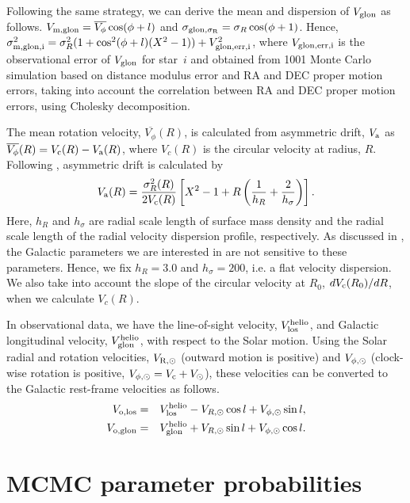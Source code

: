 \documentclass[11pt,a4paper]{article}
\begin{document}
Following the same strategy, we can derive the mean and dispersion of $V_{\rm glon}$ as follows. $V_{\rm m, glon}=\overline{V_{\phi}}\cos(\phi+l)$ and $\sigma_{\rm glon,\sigma_R}=\sigma_R \cos(\phi+1)$. Hence, $\sigma_{\rm m, glon,i}^2=\sigma_R^2(1+\cos^2(\phi+l) (X^2-1))+V_{\rm glon,err,i}^2$, where $V_{\rm glon,err,i}$ is the observational error of $V_{\rm glon}$ for star~$i$ and obtained from 1001 Monte Carlo simulation based on distance modulus error and RA and DEC proper motion errors, taking into account the correlation between RA and DEC proper motion errors, using Cholesky decomposition. 

The mean rotation velocity, $\overline{V_{\phi}} (R)$, is calculated from asymmetric drift, $V_{\rm a}$ as $\overline{V_{\phi}}(R)=V_{\rm c} (R)-V_{\rm a}(R)$, where $V_c(R)$ is the circular velocity at radius, $R$. Following \citet{baabbdc12}, asymmetric drift is calculated by 
\begin{equation}
V_{\rm a}(R)=\frac{\sigma_R^2(R)}{2 V_{\rm c}(R)} \left[X^2-1+R\left(\frac{1}{h_R}+\frac{2}{h_{\sigma}}\right)\right].
\end{equation}
Here, $h_R$ and $h_{\sigma}$ are radial scale length of surface mass density and the radial scale length of the radial velocity dispersion profile, respectively. As discussed in \citet{baabbdc12}, the Galactic parameters we are interested in are not sensitive to these parameters. Hence, we fix $h_R=3.0$ and $h_{\sigma}=200$, i.e. a flat velocity dispersion. We also take into account the slope of the circular velocity at $R_0$, $d V_{\rm c}(R_0)/dR$, when we calculate $V_c(R)$. 

In observational data, we have the line-of-sight velocity, $V_{\rm los}^{\rm helio}$, and Galactic longitudinal velocity, $V_{\rm glon}^{\rm helio}$, with respect to the Solar motion. Using the Solar radial and rotation velocities, $V_{\rm R,\odot}$ (outward motion is positive) and $V_{\rm \phi,\odot}$ (clock-wise rotation is positive, $V_{\rm \phi,\odot}=V_{\rm c}+V_{\odot}$), these velocities can be converted to the Galactic rest-frame velocities as follows.
\begin{eqnarray}
V_{\rm o,los} & = & V_{\rm los}^{\rm helio} - V_{R,\odot} \cos l + V_{\rm \phi,\odot} \sin l, \\
V_{\rm o,glon} & = & V_{\rm glon}^{\rm helio} + V_{R,\odot} \sin l + V_{\rm \phi,\odot} \cos l.
\end{eqnarray}

\section{MCMC parameter probabilities}
\end{document}
